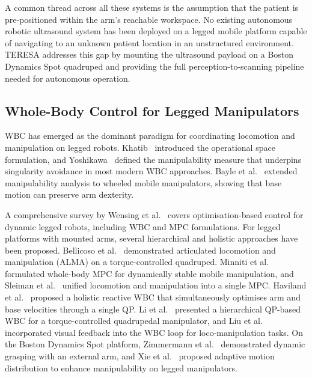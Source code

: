 A common thread across all these systems is the assumption that the patient
is pre-positioned within the arm's reachable workspace. No existing
autonomous robotic ultrasound system has been deployed on a legged mobile
platform capable of navigating to an unknown patient location in an
unstructured environment. \ac{TERESA} addresses this gap by mounting the
ultrasound payload on a Boston Dynamics Spot quadruped and providing the
full perception-to-scanning pipeline needed for autonomous operation.

\subsection{Whole-Body Control for Legged Manipulators}

\ac{WBC} has emerged as the dominant paradigm for coordinating locomotion and
manipulation on legged robots. Khatib~\cite{khatib1987} introduced the
operational space formulation, and Yoshikawa~\cite{yoshikawa1985} defined the
manipulability measure that underpins singularity avoidance in most modern
\ac{WBC} approaches. Bayle et al.~\cite{bayle2003} extended manipulability
analysis to wheeled mobile manipulators, showing that base motion can
preserve arm dexterity.

A comprehensive survey by Wensing et al.~\cite{wensing2023} covers
optimisation-based control for dynamic legged robots, including \ac{WBC} and
\ac{MPC} formulations. For legged platforms with mounted arms, several
hierarchical and holistic approaches have been proposed. Bellicoso et
al.~\cite{bellicoso2019} demonstrated articulated locomotion and manipulation
(ALMA) on a torque-controlled quadruped. Minniti et al.~\cite{minniti2019}
formulated whole-body \ac{MPC} for dynamically stable mobile manipulation,
and Sleiman et al.~\cite{sleiman2021} unified locomotion and manipulation
into a single \ac{MPC}. Haviland et al.~\cite{haviland2022} proposed a
holistic reactive \ac{WBC} that simultaneously optimises arm and base
velocities through a single \ac{QP}. Li et al.~\cite{li2022wbc} presented a
hierarchical \ac{QP}-based \ac{WBC} for a torque-controlled quadrupedal
manipulator, and Liu et al.~\cite{liu2024visual} incorporated visual feedback
into the \ac{WBC} loop for loco-manipulation tasks. On the Boston Dynamics
Spot platform, Zimmermann et al.~\cite{zimmermann2021} demonstrated dynamic
grasping with an external arm, and Xie et al.~\cite{xie2024manip} proposed
adaptive motion distribution to enhance manipulability on legged
manipulators.

